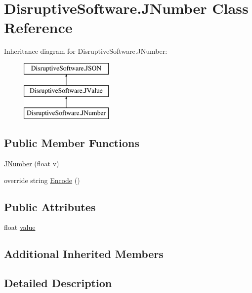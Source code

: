 \hypertarget{class_disruptive_software_1_1_j_number}{\section{Disruptive\+Software.\+J\+Number Class Reference}
\label{class_disruptive_software_1_1_j_number}
}
Inheritance diagram for Disruptive\+Software.\+J\+Number\+:\begin{figure}[H]
\begin{center}
\leavevmode
\includegraphics[height=3.000000cm]{class_disruptive_software_1_1_j_number}
\end{center}
\end{figure}
\subsection*{Public Member Functions}
\begin{DoxyCompactItemize}
\item 
\hyperlink{class_disruptive_software_1_1_j_number_a4d7448f2edcfe1a7d39529c74e0fdc84}{J\+Number} (float v)
\item 
override string \hyperlink{class_disruptive_software_1_1_j_number_a8733786caaa87ba84d62aa588d098416}{Encode} ()
\end{DoxyCompactItemize}
\subsection*{Public Attributes}
\begin{DoxyCompactItemize}
\item 
float \hyperlink{class_disruptive_software_1_1_j_number_adc93aa05ded6a53e3788cb8176dc70d7}{value}
\end{DoxyCompactItemize}
\subsection*{Additional Inherited Members}


\subsection{Detailed Description}



